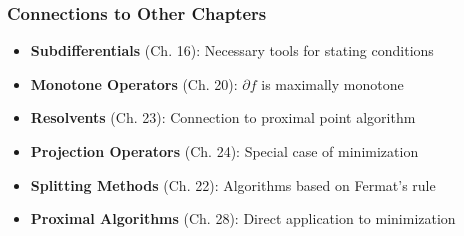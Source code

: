 \documentclass[aspectratio=169,10pt]{beamer}
\begin{document}
\begin{frame}
\frametitle{Connections to Other Chapters}

\begin{itemize}
    \item \textbf{Subdifferentials} (Ch. 16): Necessary tools for stating conditions

    \item \textbf{Monotone Operators} (Ch. 20): $\partial f$ is maximally monotone

    \item \textbf{Resolvents} (Ch. 23): Connection to proximal point algorithm

    \item \textbf{Projection Operators} (Ch. 24): Special case of minimization

    \item \textbf{Splitting Methods} (Ch. 22): Algorithms based on Fermat's rule

    \item \textbf{Proximal Algorithms} (Ch. 28): Direct application to minimization
\end{itemize}

\end{frame}
\end{document}

